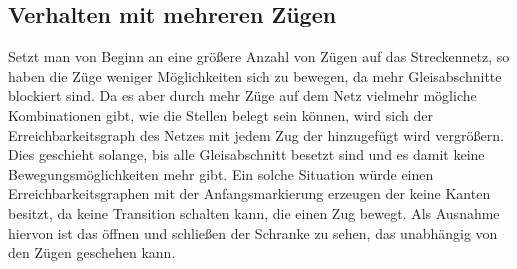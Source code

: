 \documentclass[10pt]{scrartcl}
\begin{document}
\subsection{Verhalten mit mehreren Zügen}
Setzt man von Beginn an eine größere Anzahl von Zügen auf das Streckennetz, so haben die Züge weniger Möglichkeiten sich zu bewegen, da mehr Gleisabschnitte blockiert sind. Da es aber durch mehr Züge auf dem Netz vielmehr mögliche Kombinationen gibt, wie die Stellen belegt sein können, wird sich der Erreichbarkeitsgraph des Netzes mit jedem Zug der hinzugefügt wird vergrößern. Dies geschieht solange, bis alle Gleisabschnitt besetzt sind und es damit keine Bewegungsmöglichkeiten mehr gibt. Ein solche Situation würde einen Erreichbarkeitsgraphen mit der Anfangsmarkierung erzeugen der keine Kanten besitzt, da keine Transition schalten kann, die einen Zug bewegt. Als Ausnahme hiervon ist das öffnen und schließen der Schranke zu sehen, das unabhängig von den Zügen geschehen kann.
 
\end{document}
